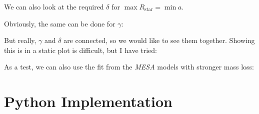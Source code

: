 \documentclass[a4paper,10pt]{article}
\begin{document}
We can also look at the required \(\delta\) for \(\max R_\text{star} = \min a\).
\begin{figure}[ht]
    \centering
\end{figure}

Obviously, the same can be done for \(\gamma \):

\begin{figure}[ht]
    \centering
\end{figure}

But really, \(\gamma \) and \(\delta \) are connected, so we would like to see them together. Showing this is in a static plot is difficult, but I have tried:

\begin{figure}[ht]
    \centering
\end{figure}
As a test, we can also use the fit from the \emph{MESA} models with stronger mass loss:
\begin{figure}[ht]
    \centering
\end{figure}





\nextpage
\appendix
\section{Python Implementation}
\end{document}

